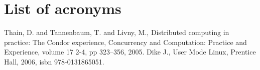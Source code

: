 \documentclass{PoS}
\begin{document}
\appendix

\section{List of acronyms}
\label{sec:acro}



\begin{thebibliography}{99}
   Thain, D. and Tannenbaum, T. and Livny,
    M., Distributed computing in practice: The Condor experience,
    Concurrency and Computation: Practice and Experience, volume 17
    2-4, pp 323--356, 2005.
   Dike J., User Mode Linux, Prentice Hall, 2006, isbn 978-0131865051.
\end{thebibliography}
\end{document}
